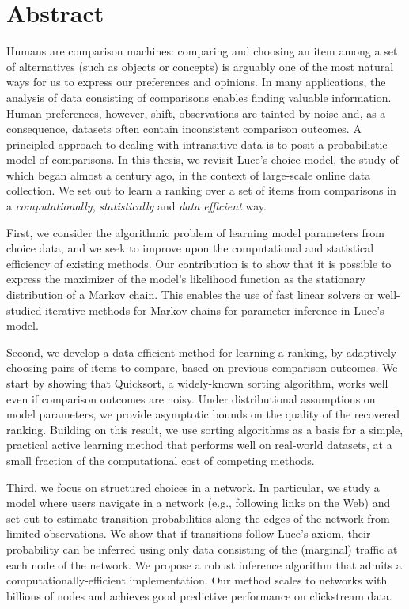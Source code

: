 \cleardoublepage
\chapter*{Abstract}

Humans are comparison machines: comparing and choosing an item among a set of alternatives (such as objects or concepts) is arguably one of the most natural ways for us to express our preferences and opinions.
In many applications, the analysis of data consisting of comparisons enables finding valuable information.
Human preferences, however, shift, observations are tainted by noise and, as a consequence, datasets often contain inconsistent comparison outcomes.
A principled approach to dealing with intransitive data is to posit a probabilistic model of comparisons.
In this thesis, we revisit Luce's choice model, the study of which began almost a century ago, in the context of large-scale online data collection.
We set out to learn a ranking over a set of items from comparisons in a \emph{computationally}, \emph{statistically} and \emph{data efficient} way.

First, we consider the algorithmic problem of learning model parameters from choice data, and we seek to improve upon the computational and statistical efficiency of existing methods.
Our contribution is to show that it is possible to express the maximizer of the model's likelihood function as the stationary distribution of a Markov chain.
This enables the use of fast linear solvers or well-studied iterative methods for Markov chains for parameter inference in Luce's model.

Second, we develop a data-efficient method for learning a ranking, by adaptively choosing pairs of items to compare, based on previous comparison outcomes.
We start by showing that Quicksort, a widely-known sorting algorithm, works well even if comparison outcomes are noisy.
Under distributional assumptions on model parameters, we provide asymptotic bounds on the quality of the recovered ranking.
Building on this result, we use sorting algorithms as a basis for a simple, practical active learning method that performs well on real-world datasets, at a small fraction of the computational cost of competing methods.

Third, we focus on structured choices in a network.
In particular, we study a model where users navigate in a network (e.g., following links on the Web) and set out to estimate transition probabilities along the edges of the network from limited observations.
We show that if transitions follow Luce's axiom, their probability can be inferred using only data consisting of the (marginal) traffic at each node of the network.
We propose a robust inference algorithm that admits a computationally-efficient implementation.
Our method scales to networks with billions of nodes and achieves good predictive performance on clickstream data.

